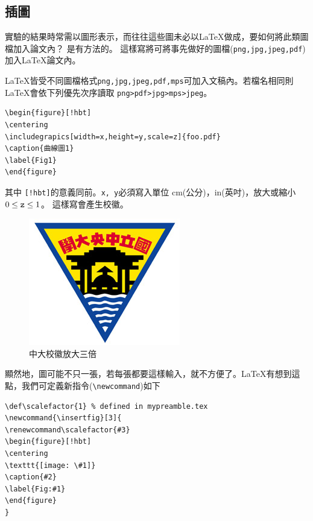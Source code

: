 \subsection{插圖}
實驗的結果時常需以圖形表示，而往往這些圖未必以\LaTeX{}做成，要如何將此類圖檔加入論文內？ 是有方法的。 這樣寫將可將事先做好的圖檔({\tt png,jpg,jpeg,pdf})加入\LaTeX{}論文內。 

\LaTeX{}皆受不同圖檔格式{\tt png,jpg,jpeg,pdf,mps}可加入文稿內。若檔名相同則\LaTeX{}會依下列優先次序讀取
{\tt png>pdf>jpg>mps>jpeg}。
\begin{Verbatim}[frame=single,firstline=1,label=Every figure]
\begin{figure}[!hbt]
\centering
\includegrapics[width=x,height=y,scale=z]{foo.pdf}  
\caption{曲線圖1}
\label{Fig1}
\end{figure}
\end{Verbatim}
其中 {\tt[!hbt]}的意義同前。{\tt x, y}必須寫入單位 cm(公分)，in(英吋)，放大或縮小 $0 \le {\tt z} \le 1$。
這樣寫會產生校徽。
\begin{figure}[!hbt]
\centering
\includegraphics[scale=3]{NCUlogo} 
\caption{中大校徽放大三倍}
\label{Fig1}
\end{figure}%
顯然地，圖可能不只一張，若每張都要這樣輸入，就不方便了。\LaTeX{}有想到這點，我們可定義新指令({\tt \textbackslash newcommand})如下\\ 
\begin{Verbatim}[frame=single,firstline=1,label={Macro with parameters}]
\def\scalefactor{1} % defined in mypreamble.tex
\newcommand{\insertfig}[3]{
\renewcommand\scalefactor{#3}
\begin{figure}[!hbt]
\centering
\texttt{[image: \#1]}
\caption{#2}
\label{Fig:#1}
\end{figure}
}
\end{Verbatim}
